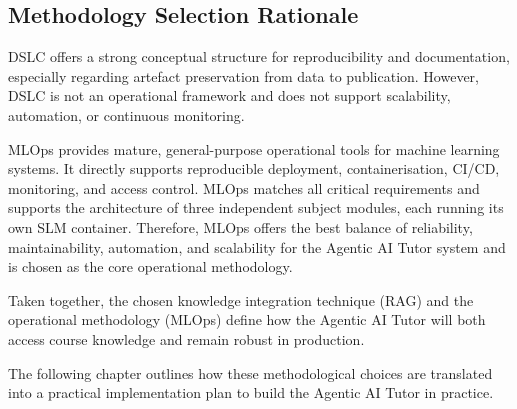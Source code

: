 \subsection{Methodology Selection Rationale}

DSLC offers a strong conceptual structure for reproducibility and documentation, especially regarding artefact preservation from data to publication. However, DSLC is not an operational framework and does not support scalability, automation, or continuous monitoring.

MLOps provides mature, general-purpose operational tools for machine learning systems. It directly supports reproducible deployment, containerisation, CI/CD, monitoring, and access control. MLOps matches all critical requirements and supports the architecture of three independent subject modules, each running its own SLM container. Therefore, MLOps offers the best balance of reliability, maintainability, automation, and scalability for the Agentic AI Tutor system and is chosen as the core operational methodology.

Taken together, the chosen knowledge integration technique (RAG) and the operational methodology (MLOps) define how the Agentic AI Tutor will both access course knowledge and remain robust in production.

The following chapter outlines how these methodological choices are translated into a practical implementation plan to build the Agentic AI Tutor in practice.
